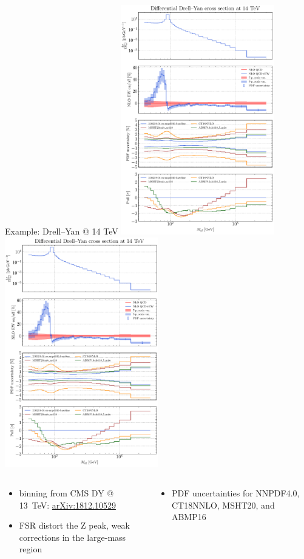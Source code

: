 \begin{frame}[t]{Example: Drell--Yan @ 14 TeV}
\fontsize{9}{11}\selectfont
\includegraphics[trim=0 350 0 0,clip,width=0.5\textwidth]{ew_corrections/figures/NNPDF40_DY_Z-global}%
\includegraphics[trim=0 0 0 330,clip,width=0.5\textwidth]{ew_corrections/figures/NNPDF40_DY_Z-global}
\begin{columns}[T,onlytextwidth]
\begin{column}{0.5\textwidth}
\begin{itemize}
\item binning from CMS DY @ \SI{13}{\tera\electronvolt}: \href{https://arxiv.org/abs/1812.10529}{arXiv:1812.10529}
\item FSR distort the Z peak, weak corrections in the large-mass region
\end{itemize}
\end{column}
\begin{column}{0.5\textwidth}
\begin{itemize}
\item PDF uncertainties for NNPDF4.0, CT18NNLO, MSHT20, and ABMP16
\end{itemize}
\end{column}
\end{columns}
\end{frame}
